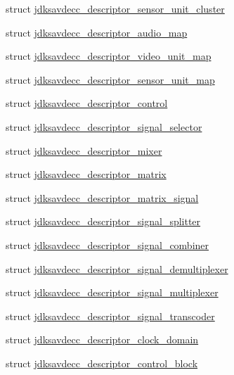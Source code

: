 \begin{DoxyCompactItemize}
\item 
struct \hyperlink{structjdksavdecc__descriptor__sensor__unit__cluster}{jdksavdecc\+\_\+descriptor\+\_\+sensor\+\_\+unit\+\_\+cluster}
\item 
struct \hyperlink{structjdksavdecc__descriptor__audio__map}{jdksavdecc\+\_\+descriptor\+\_\+audio\+\_\+map}
\item 
struct \hyperlink{structjdksavdecc__descriptor__video__unit__map}{jdksavdecc\+\_\+descriptor\+\_\+video\+\_\+unit\+\_\+map}
\item 
struct \hyperlink{structjdksavdecc__descriptor__sensor__unit__map}{jdksavdecc\+\_\+descriptor\+\_\+sensor\+\_\+unit\+\_\+map}
\item 
struct \hyperlink{structjdksavdecc__descriptor__control}{jdksavdecc\+\_\+descriptor\+\_\+control}
\item 
struct \hyperlink{structjdksavdecc__descriptor__signal__selector}{jdksavdecc\+\_\+descriptor\+\_\+signal\+\_\+selector}
\item 
struct \hyperlink{structjdksavdecc__descriptor__mixer}{jdksavdecc\+\_\+descriptor\+\_\+mixer}
\item 
struct \hyperlink{structjdksavdecc__descriptor__matrix}{jdksavdecc\+\_\+descriptor\+\_\+matrix}
\item 
struct \hyperlink{structjdksavdecc__descriptor__matrix__signal}{jdksavdecc\+\_\+descriptor\+\_\+matrix\+\_\+signal}
\item 
struct \hyperlink{structjdksavdecc__descriptor__signal__splitter}{jdksavdecc\+\_\+descriptor\+\_\+signal\+\_\+splitter}
\item 
struct \hyperlink{structjdksavdecc__descriptor__signal__combiner}{jdksavdecc\+\_\+descriptor\+\_\+signal\+\_\+combiner}
\item 
struct \hyperlink{structjdksavdecc__descriptor__signal__demultiplexer}{jdksavdecc\+\_\+descriptor\+\_\+signal\+\_\+demultiplexer}
\item 
struct \hyperlink{structjdksavdecc__descriptor__signal__multiplexer}{jdksavdecc\+\_\+descriptor\+\_\+signal\+\_\+multiplexer}
\item 
struct \hyperlink{structjdksavdecc__descriptor__signal__transcoder}{jdksavdecc\+\_\+descriptor\+\_\+signal\+\_\+transcoder}
\item 
struct \hyperlink{structjdksavdecc__descriptor__clock__domain}{jdksavdecc\+\_\+descriptor\+\_\+clock\+\_\+domain}
\item 
struct \hyperlink{structjdksavdecc__descriptor__control__block}{jdksavdecc\+\_\+descriptor\+\_\+control\+\_\+block}
\end{DoxyCompactItemize}

